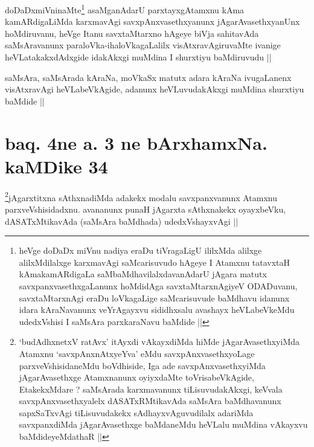 \begin{artha}
doDaDxmiVninaMte\footnote[1]{heVge doDaDx miVnu nadiya eraDu
  tiVragaLigU ililxMda alilxge alilxMdilalxge karxmavAgi saMcarisuvudo
hAgeye I Atamxnu tatavxtaH kAmakamARdigaLa saMbaMdhavilalxdavanAdarU
jAgara matutx savxpanxvasethxgaLanunx hoMdidAga savxtaMtarxnAgiyeV
ODADuvanu, savxtaMtarxnAgi eraDu loVkagaLige saMcarisuvude baMdhavu
idanunx idara kAraNavanunx veYrAgayxvu sididhxsalu avashayx
heVLabeVkeMdu udedxVshisi I saMsAra parxkaraNavu baMdide ||} asaMganAdarU parxtayxgAtamxnu kAma
kamARdigaLiMda karxmavAgi savxpAnxvasethxyanunx jAgarAvasethxyanUnx
hoMdiruvanu, heVge Itanu savxtaMtarxno hAgeye biVja sahitavAda
saMsAravanunx paraloVka-ihaloVkagaLalilx visAtxravAgiruvaMte ivanige
heVLatakakxdAdxgide idakAkxgi muMdina I shurxtiyu baMdiruvudu ||
\end{artha}


\begin{artha}
saMsAra, saMsArada kAraNa, moVkaSx matutx adara kAraNa ivugaLanenx
visAtxravAgi heVLabeVkAgide, adanunx heVLuvudakAkxgi muMdina shurxtiyu
baMdide ||
\end{artha}

\section*{baq. 4ne a. 3 ne bArxhamxNa. kaMDike 34}

\stext


\begin{artha}
\footnote[1]{`budAdhxnetxV ratAvx' itAyxdi vAkayxdiMda hiMde
  jAgarAvasethxyiMda Atamxnu `savxpAnxnAtxyeYva' eMdu
  savxpAnxvasethxyoLage parxveVshisidaneMdu boVdhiside, Iga ade
  savxpAnxvasethxyiMda jAgarAvasethxge Atamxnanunx oyiyxdaMte
  toVrisabeVkAgide, EtakekxMdare ? saMsArada karxmavanunx
  tiLisuvudakAkxgi, keVvala savxpAnxvasethxyalelx dASATxRMtikavAda
  saMsAra baMdhavanunx sapxSaTxvAgi tiLisuvudakekx sAdhayxvAguvudilalx
  adariMda savxpanxdiMda jAgarAvasethxge baMdaneMdu heVLalu muMdina
  vAkayxvu baMdideyeMdathaR ||}jAgarxtitxna sAthxnadiMda adakekx modalu savxpanxvanunx
Atamxnu parxveVshisidadxnu. avananunx punaH jAgarxta sAthxnakekx
oyayxbeVku, dASATxMtikavAda (saMsAra baMdhada) udedxVshayxvAgi ||
\end{artha}

